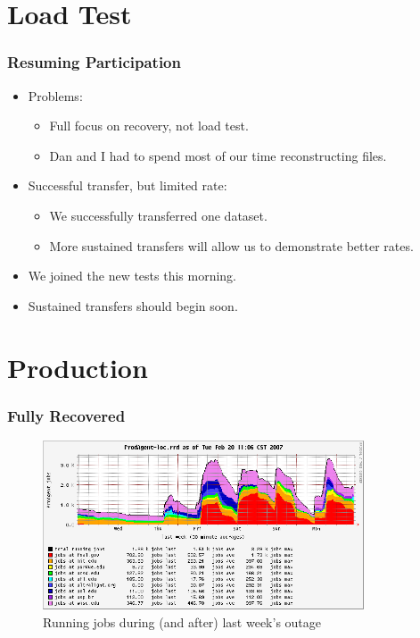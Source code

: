 \documentclass{beamer}
\begin{document}
\section{Load Test}
\begin{frame}
    \frametitle{Resuming Participation}
    \begin{itemize}
        \item Problems:
        \begin{itemize}
            \item Full focus on recovery, not load test.
            \item Dan and I had to spend most of our time reconstructing files.
        \end{itemize}
        \item Successful transfer, but limited rate:
        \begin{itemize}
            \item We successfully transferred one dataset.
            \item More sustained transfers will allow us to demonstrate better rates.
        \end{itemize}
        \item We joined the new tests this morning.
        \item Sustained transfers should begin soon.
    \end{itemize}
\end{frame}

\section{Production}
\begin{frame}
    \frametitle{Fully Recovered}
    \begin{center}
    \begin{figure}
    \includegraphics*[height=5cm]{Graphics/ProdAgent-loc_1wk.png}
    \caption{Running jobs during (and after) last week's outage}
    \end{figure}
    \end{center}
\end{frame}
\end{document}
